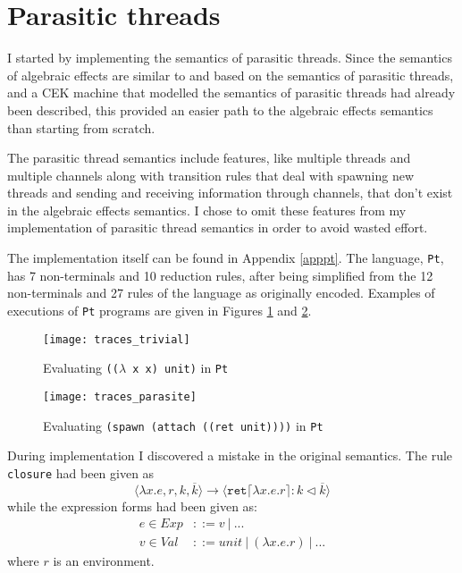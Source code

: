 \documentclass[12pt,a4paper,twoside,openright]{report}
\begin{document}
\section{Parasitic threads}\label{implfirst}

I started by implementing the semantics of parasitic threads. Since the semantics of algebraic effects are similar to and based on the semantics of parasitic threads, and a CEK machine that modelled the semantics of parasitic threads had already been described,\cite{Siv2014} this provided an easier path to the algebraic effects semantics than starting from scratch.

The parasitic thread semantics include features, like multiple threads and multiple channels along with transition rules that deal with spawning new threads and sending and receiving information through channels, that don't exist in the algebraic effects semantics. I chose to omit these features from my implementation of parasitic thread semantics in order to avoid wasted effort.

The implementation itself can be found in Appendix \ref{apppt}. The language, \texttt{Pt}, has 7 non-terminals and 10 reduction rules, after being simplified from the 12 non-terminals and 27 rules of the language as originally encoded. Examples of executions of \texttt{Pt} programs are given in Figures \ref{fig:traces_trivial} and \ref{fig:traces_parasite}. 

\begin{figure}
\centering
\caption{Evaluating \texttt{(($\lambda$ x x) unit)} in \texttt{Pt}}
\label{fig:traces_trivial}
\texttt{[image: traces\_trivial]}
\end{figure}

\begin{figure}
\centering
\caption{Evaluating \texttt{(spawn (attach ((ret unit))))} in \texttt{Pt}}
\label{fig:traces_parasite}
\texttt{[image: traces\_parasite]}
\end{figure}

During implementation I discovered a mistake in the original semantics. The rule \texttt{closure} had been given as
$$\langle\lambda x.e, r, k, \overline{k} \rangle \longrightarrow \langle \texttt{ret} \lceil \lambda x.e.r \rceil : k \lhd \overline{k} \rangle$$
while the expression forms had been given as:
\begin{align} 
\nonumber e \in Exp &::= v\:  |\:  ... \\
\nonumber v \in Val &::= unit\:  |\:  (\lambda x.e.r)\:  |\:  ... 
\end{align}
where $r$ is an environment.
\end{document}
